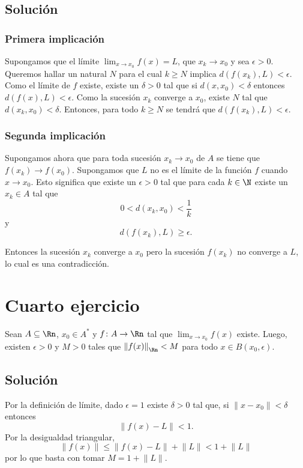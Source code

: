 \documentclass{scrartcl}
\begin{document}
\subsection{Solución}

\subsubsection{Primera implicación}

Supongamos que el límite \(\lim_{x\to x_0}f(x) = L\),
que \(x_k\to x_0\) y sea \(\epsilon>0\).
Queremos hallar un natural \(N\) para el cual \(k\geq N\)
implica \(d(f(x_k),L) < \epsilon\).
Como el límite de \(f\) existe, existe un \(\delta >0\) tal que
si \(d(x,x_0) < \delta\)
entonces \(d(f(x),L) < \epsilon\).
Como la sucesión $x_k$ converge a $x_0$, existe $N$ tal que
\(d(x_k,x_0) < \delta\).
Entonces, para todo \(k\geq N\) se tendrá que
\(d(f(x_k),L) < \epsilon\).

\subsubsection{Segunda implicación}

Supongamos ahora que para toda sucesión \(x_k\to x_0\)
de \(A\) se tiene que \(f(x_k)\to f(x_0)\).
Supongamos que $L$ no es el límite de la función \(f\)
cuando $x\to x_0$.
Esto significa que existe un \(\epsilon > 0\) tal que
para cada \(k\in\N\) existe un \(x_k\in A\) tal que
\[ 0 < d(x_k,x_0) < \frac{1}{k} \]
y
\[ d(f(x_k),L) \geq \epsilon.\]

Entonces la sucesión \(x_k\) converge a \(x_0\)
pero la sucesión \(f(x_k)\) no converge a \(L\),
lo cual es una contradicción.

\section{Cuarto ejercicio}

Sean \(A\subseteq\Rn\), \(x_{0}\in A^{\ast}\)
y \(f\colon A \to\Rn\) tal que
\(\lim_{x\to x_{0}} f(x)\)  existe.
Luego, existen \(\epsilon>0\) y \(M>0\) tales
que \(\left\lVert f(x) \right\rVert_{\Rn} < M\)
para todo \(x\in B(x_0,\epsilon)\).

\subsection{Solución}

Por la definición de límite,
dado \(\epsilon=1\) existe \(\delta>0\)
tal que, si \(\lVert x-x_0\rVert<\delta\)
entonces
\[\lVert f(x) - L \rVert < 1.\]
Por la desigualdad triangular,
\[\lVert f(x)\rVert \leq \lVert f(x) - L \rVert + \lVert L\rVert
    < 1 + \lVert L\rVert\]
por lo que basta con tomar \(M=1+\lVert L\rVert\).
\end{document}
